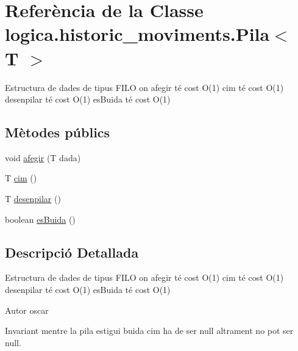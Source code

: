 \hypertarget{classlogica_1_1historic__moviments_1_1_pila_3_01_t_01_4}{\section{Referència de la Classe logica.\+historic\+\_\+moviments.\+Pila$<$ T $>$}
\label{classlogica_1_1historic__moviments_1_1_pila_3_01_t_01_4}
}


Estructura de dades de tipus F\+I\+L\+O on afegir té cost O(1) cim té cost O(1) desenpilar té cost O(1) es\+Buida té cost O(1)  


\subsection*{Mètodes públics}
\begin{DoxyCompactItemize}
\item 
void \hyperlink{classlogica_1_1historic__moviments_1_1_pila_3_01_t_01_4_a4c7677e80d1a2e750036374680e8de69}{afegir} (T dada)
\item 
T \hyperlink{classlogica_1_1historic__moviments_1_1_pila_3_01_t_01_4_ada68762ef342309936234ed5976a5f89}{cim} ()
\item 
T \hyperlink{classlogica_1_1historic__moviments_1_1_pila_3_01_t_01_4_a4eee9c634e4eb6a3a7fe84132374cee5}{desenpilar} ()
\item 
boolean \hyperlink{classlogica_1_1historic__moviments_1_1_pila_3_01_t_01_4_a8eb489a3420043963be8160a873f6d65}{es\+Buida} ()
\end{DoxyCompactItemize}


\subsection{Descripció Detallada}
Estructura de dades de tipus F\+I\+L\+O on afegir té cost O(1) cim té cost O(1) desenpilar té cost O(1) es\+Buida té cost O(1) 

\begin{DoxyAuthor}{Autor}
oscar 
\end{DoxyAuthor}
\begin{DoxyInvariant}{Invariant}
mentre la pila estigui buida cim ha de ser null altrament no pot ser null. 
\end{DoxyInvariant}


